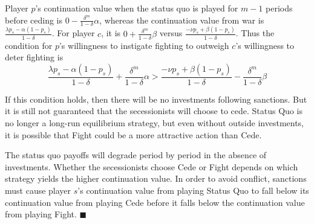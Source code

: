 \documentclass[11pt,letterpaper, notitlepage]{article}
\newcommand{\de}{\delta}
\begin{document}
Player $p$'s continuation value when the status quo is played for $m-1$ periods before ceding is $0 - \frac{\de^m}{1-\de} \alpha$, whereas the continuation value from war is $\frac{\lambda p_s - \alpha (1-p_s)}{1-\de}$. For player $c$, it is $0 + \frac{\de^m}{1-\de} \beta$ versus $\frac{-\nu p_s + \beta (1 - p_s)}{1-\de}$. Thus the condition for $p$'s willingness to instigate fighting to outweigh $c$'s willingness to deter fighting is
\[
  \textstyle \frac{\lambda p_s - \alpha (1-p_s)}{1-\de} + \frac{\de^m}{1-\de} \alpha > \frac{-\nu p_s + \beta (1-p_s)}{1-\de} -  \frac{\de^m}{1-\de} \beta
\]

If this condition holds, then there will be no investments following sanctions. But it is still not guaranteed that the secessionists will choose to cede. Status Quo is no longer a long-run equilibrium strategy, but even without outside investments, it is possible that Fight could be a more attractive action than Cede.

The status quo payoffs will degrade period by period in the absence of investments. Whether the secessionists choose Cede or Fight depends on which strategy yields the higher continuation value. In order to avoid conflict, sanctions must cause player $s$'s continuation value from playing Status Quo to fall below its continuation value from playing Cede before it falls below the continuation value from playing Fight. \hfill $\blacksquare$


\end{document}
